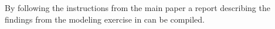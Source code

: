 By following the instructions from the main paper a report describing the findings from the modeling exercise in \autocite{Bauer2019} can be compiled.
  
